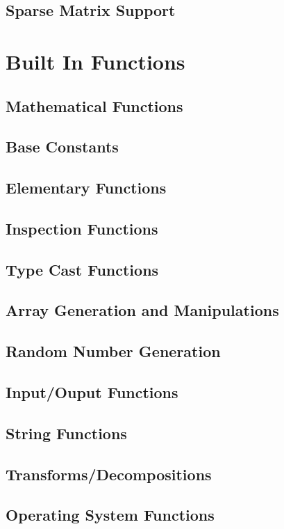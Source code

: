 \documentclass{book}
\begin{document}
\section{Sparse Matrix Support}

\chapter{Built In Functions}
\section{Mathematical Functions}

\section{Base Constants}

\section{Elementary Functions}

\section{Inspection Functions}

\section{Type Cast Functions}

\section{Array Generation and Manipulations}

\section{Random Number Generation}

\section{Input/Ouput Functions}

\section{String Functions}

\section{Transforms/Decompositions}

\section{Operating System Functions}

\end{document}
